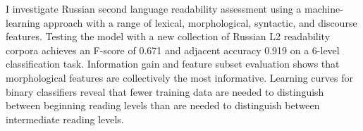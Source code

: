 I investigate Russian second language readability assessment using a machine-learning approach with a range of lexical, morphological, syntactic, and discourse features. Testing the model with a new collection of Russian L2 readability corpora achieves an F-score of 0.671 and adjacent accuracy 0.919 on a 6-level classification task. Information gain and feature subset evaluation shows that morphological features are collectively the most informative. Learning curves for binary classifiers reveal that fewer training data are needed to distinguish between beginning reading levels than are needed to distinguish between intermediate reading levels.
